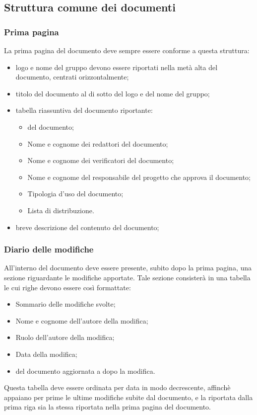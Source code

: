   \subsection{Struttura comune dei documenti}
  \subsubsection{Prima pagina}
  La prima pagina del documento deve sempre essere conforme a questa struttura:
  \begin{itemize}
    \item logo e nome del gruppo devono essere riportati nella metà alta del documento, centrati orizzontalmente;
    \item titolo del documento al di sotto del logo e del nome del gruppo;
    \item tabella riassuntiva del documento riportante:
      \begin{itemize}
      \item {} del documento;
      \item Nome e cognome dei redattori del documento;
      \item Nome e cognome dei verificatori del documento;
      \item Nome e cognome del responsabile del progetto che approva il documento;
      \item Tipologia d'uso del documento;
      \item Lista di distribuzione.
      \end{itemize}
    \item breve descrizione del contenuto del documento;
  \end{itemize}

  \subsubsection{Diario delle modifiche}
  All'interno del documento deve essere presente, subito dopo la prima pagina, una sezione riguardante le modifiche apportate. Tale sezione consisterà in una tabella le cui righe devono essere cos\`i formattate:
  \begin{itemize}
  \item Sommario delle modifiche svolte;
  \item Nome e cognome dell'autore della modifica;
  \item Ruolo dell'autore della modifica;
  \item Data della modifica;
  \item {} del documento aggiornata a dopo la modifica.
  \end{itemize}
  Questa tabella deve essere ordinata per data in modo decrescente, affinch\`e appaiano per prime le ultime modifiche subite dal documento, e la  riportata dalla prima riga sia la stessa riportata nella prima pagina del documento.

